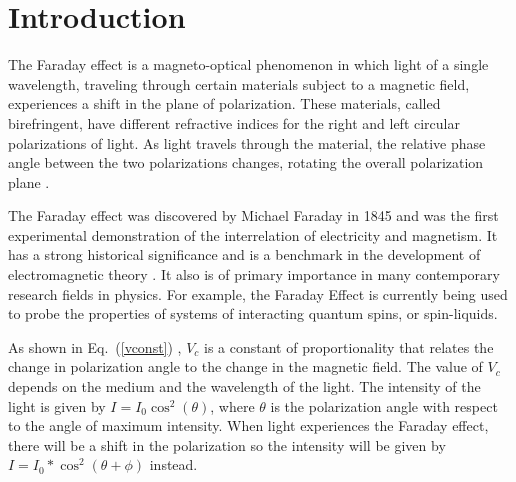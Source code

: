 \documentclass[prb,preprint]{revtex4-1}
\begin{document}
\section{Introduction} 

{The Faraday effect is a magneto-optical phenomenon in which light of a single wavelength, traveling through certain materials subject to a magnetic field, experiences a shift in the plane of polarization. These materials, called birefringent, have different refractive indices for the right and left circular polarizations of light. As light travels through the material, the relative phase angle between the two polarizations changes, rotating the overall polarization plane \cite{melissinos}.  

The Faraday effect was discovered by Michael Faraday in 1845 and was the first experimental demonstration of the interrelation of electricity and magnetism.  It has a strong historical significance and is a benchmark in the development of electromagnetic theory \cite{melissinos}.  It also is of primary importance in many contemporary research fields in physics.  For example, the Faraday Effect is currently being used to probe the properties of systems of interacting quantum spins, or spin-liquids.\cite{spin}


As shown in Eq.~(\ref{vconst}) , $V_{c}$ is a constant of proportionality that relates the change in polarization angle to the change in the magnetic field.\cite{expphysics} The value of $V_{c}$ depends on the medium and the wavelength of the light. The intensity of the light is given by $I=I_{0}\cos^{2}(\theta)$, where $\theta$ is the polarization angle with respect to the angle of  maximum intensity. When light experiences the Faraday effect, there will be a shift in the polarization so the intensity will be given by $I=I_{0}*\cos^{2}(\theta+\phi)$ instead.
}
\end{document}
